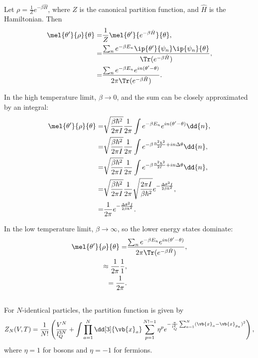 \documentclass[a4paper,12pt,twoside]{article}
\begin{document}
\begin{multicols*}{2}
\subsubsection{}
Let $\rho = \frac{1}{Z} e^{-\beta\hat{H}}$, where $Z$ is the canonical partition function, and $\hat{H}$ is the Hamiltonian.
Then
\begin{align}
	\mel{\theta'}{\rho}{\theta} =& \frac{1}{Z} \mel{\theta'}{e^{-\beta\hat{H}}}{\theta},\\
	=& \frac{\sum_n e^{-\beta E_n}\ip{\theta'}{\psi_n}\ip{\psi_n}{\theta}}{\Tr( e^{-\beta \hat{H}})},\\
	=& \frac{\sum_n e^{-\beta E_n}e^{i n(\theta'-\theta)}}{2\pi\Tr(e^{-\beta \hat{H}})}.
\end{align}

In the high temperature limit, $\beta \rightarrow 0$, and the sum can be closely approximated by an integral:
\begin{align}
	\mel{\theta'}{\rho}{\theta}
	=&\sqrt{\frac{\beta\hbar^2}{2\pi I}}\frac{1}{2\pi} \int e^{-\beta E_n}e^{i n(\theta'-\theta)}\dd{n},\\
	=&\sqrt{\frac{\beta\hbar^2}{2\pi I}}\frac{1}{2\pi} \int e^{-\beta \frac{n^2\hbar^2}{2I}+in\Delta\theta}\dd{n},\\
	=&\sqrt{\frac{\beta\hbar^2}{2\pi I}}\frac{1}{2\pi} \int e^{-\beta \frac{n^2\hbar^2}{2I}+in\Delta\theta}\dd{n},\\
	=&\sqrt{\frac{\beta\hbar^2}{2\pi I}}\frac{1}{2\pi} \sqrt{\frac{2\pi I}{\beta \hbar^2}} e^{-\frac{\Delta\theta^2 I}{2 \beta \hbar^2}},\\
	=&\frac{1}{2\pi} e^{-\frac{\Delta\theta^2 I}{2\beta\hbar^2}}.
\end{align}

In the low temperature limit, $\beta \rightarrow \infty$, so the lower energy states dominate:
\begin{align}
	\mel{\theta'}{\rho}{\theta}
	=& \frac{\sum_n e^{-\beta E_n}e^{i n(\theta'-\theta)}}{2\pi\Tr(e^{-\beta \hat{H}})},\\
	\approx \frac{1}{2\pi} \frac{1}{1},\\
	= \frac{1}{2\pi}.
\end{align}

\subsection{}
For $N$-identical particles, the partition function is given by
\begin{equation}
	Z_N (V,T) = \frac{1}{N!} \left(\frac{V^N}{l_Q^{3N}} + \int\prod_{a=1}^N \dd[3]{\vb{x}_a}\sum_{p=1}^{N!-1}\eta^p e^{-\frac{\pi}{l_Q^2}\sum_{a=1}^N (\vb{x}_a-\vb{x}_{p_a})^2}\right),
\end{equation}
where $\eta = 1$ for bosons and $\eta = -1$ for fermions.

\end{multicols*}
\end{document}
